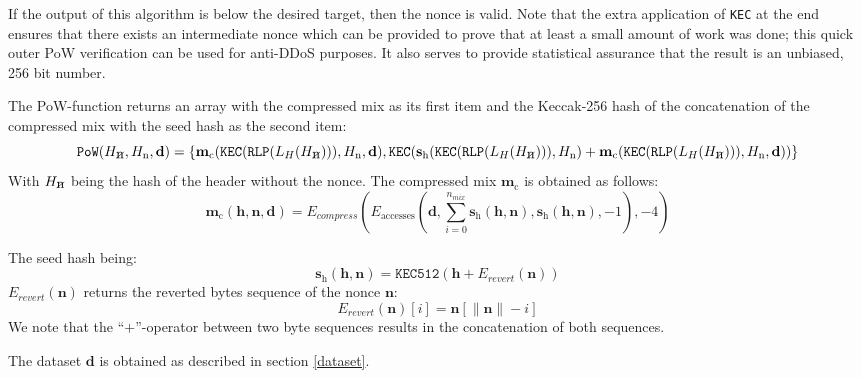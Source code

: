\documentclass[9pt,oneside]{amsart}
\newcommand{\hcancel}[1]{%
    \tikz[baseline=(tocancel.base)]{
        \node[inner sep=0pt,outer sep=0pt] (tocancel) {#1};
        \draw[black] (tocancel.south west) -- (tocancel.north east);
    }%
}%
\begin{document}
If the output of this algorithm is below the desired target, then the nonce is valid. Note that the extra application of \texttt{KEC} at the end ensures that there exists an intermediate nonce which can be provided to prove that at least a small amount of work was done; this quick outer PoW verification can be used for anti-DDoS purposes. It also serves to provide statistical assurance that the result is an unbiased, 256 bit number.

The PoW-function returns an array with the compressed mix as its first item and the Keccak-256 hash of the concatenation of the compressed mix with the seed hash as the second item:
\begin{equation}
 \mathtt{PoW}(H_{\hcancel{n}}, H_{\mathrm{n}}, \mathbf{d}) = \lbrace \mathbf{m}_{\mathrm{c}}(\mathtt{\small KEC}(\mathtt{\small RLP}(L_{H}(H_{\hcancel{n}}))), H_{\mathrm{n}}, \mathbf{d}), \texttt{KEC}(\mathbf{s}_{\mathrm{h}}(\mathtt{\small KEC}(\mathtt{\small RLP}(L_{H}(H_{\hcancel{n}}))), H_{\mathrm{n}}) + \mathbf{m}_{\mathrm{c}}(\mathtt{\small KEC}(\mathtt{\small RLP}(L_{H}(H_{\hcancel{n}}))), H_{\mathrm{n}}, \mathbf{d})) \rbrace
\end{equation}
With $H_{\hcancel{n}}$ being the hash of the header without the nonce. The compressed mix $\mathbf{m}_{\mathrm{c}}$ is obtained as follows:
\begin{equation}
 \mathbf{m}_{\mathrm{c}}(\mathbf{h}, \mathbf{n}, \mathbf{d}) = E_{compress}(E_{\mathrm{accesses}}(\mathbf{d}, \sum_{i = 0}^{n_{mix}} \mathbf{s}_{\mathrm{h}}(\mathbf{h}, \mathbf{n}), \mathbf{s}_{\mathrm{h}}(\mathbf{h}, \mathbf{n}), -1), -4)
\end{equation}

The seed hash being:
\begin{equation}
 \mathbf{s}_{\mathrm{h}}(\mathbf{h}, \mathbf{n}) = \texttt{KEC512}(\mathbf{h} + E_{revert}(\mathbf{n}))
\end{equation}
$E_{revert}(\mathbf{n})$ returns the reverted bytes sequence of the nonce $\mathbf{n}$:
\begin{equation}
 E_{revert}(\mathbf{n})[i] = \mathbf{n}[\lVert \mathbf{n} \rVert -i]
\end{equation}
We note that the ``$+$''-operator between two byte sequences results in the concatenation of both sequences.

The dataset $\mathbf{d}$ is obtained as described in section \ref{dataset}.
\end{document}
